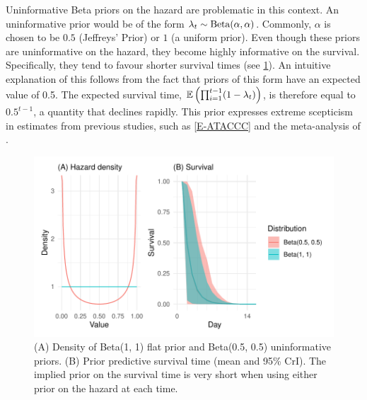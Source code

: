 \documentclass[thesis.tex]{subfiles}
\begin{document}
Uninformative Beta priors on the hazard are problematic in this context.
An uninformative prior would be of the form $\lambda_t \sim \operatorname{Beta}(\alpha, \alpha)$.
Commonly, $\alpha$ is chosen to be $0.5$ (Jeffreys' Prior) or $1$ (a uniform prior).
Even though these priors are uninformative on the hazard, they become highly informative on the survival. 
Specifically, they tend to favour shorter survival times (see \cref{perf-test:fig:flat-prior}).
An intuitive explanation of this follows from the fact that priors of this form have an expected value of 0.5.
The expected survival time, $\operatorname{\mathbb{E}} \left( \prod_{i=1}^{t-1} (1-\lambda_t) \right)$, is therefore equal to $0.5^{t-1}$, a quantity that declines rapidly.
This prior expresses extreme scepticism in estimates from previous studies, such as \cref{E-ATACCC} and the meta-analysis of \textcite{cevikShedding}.
\begin{figure}
  \centering \includegraphics{cis-perfect-testing/flat-prior}
  \caption[Uninformative priors for the hazard]{
    (A) Density of Beta(1, 1) flat prior and Beta(0.5, 0.5) uninformative priors.
    (B) Prior predictive survival time (mean and 95\% CrI).
    The implied prior on the survival time is very short when using either prior on the hazard at each time.
  }
 \label{perf-test:fig:flat-prior}
\end{figure}
\end{document}
